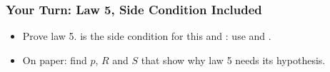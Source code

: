 \documentclass{ltx-talk}
\begin{document}
\begin{frame*}
  \frametitle{Your Turn: Law 5, Side Condition Included}
  \begin{itemize}
    \item {} Prove law 5.  is the side condition for
      this  and : use  and
      .
    \item {} On paper: find $p$, $R$ and $S$ that show why law 5
      needs its hypothesis.
  \end{itemize}
\end{frame*}
\end{document}
